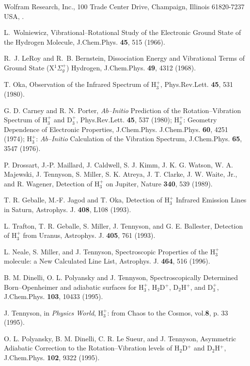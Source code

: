 \begin{thebibliography}{999}
Wolfram Research, Inc., 
100 Trade Center Drive, Champaign, Illinois 61820-7237
USA,
.

L.~Wolniewicz,
Vibrational--Rotational Study of the Electronic Ground State 
of the Hydrogen Molecule,
\newblock J.Chem.Phys. {\bf 45}, 515 (1966).

R.~J. Le{R}oy and R.~B. Bernstein,
Dissociation Energy and Vibrational Terms of Ground State 
(X$^{1} \Sigma _g ^+$) Hydrogen,
\newblock  J.Chem.Phys. {\bf 49}, 4312 (1968).


T. Oka, 
Observation of the Infrared Spectrum of H$_3^+$, 
Phys.Rev.Lett. {\bf 45}, 531 (1980).

G. D. Carney and R. N. Porter, 
{\it Ab--Initio} Prediction of the Rotation--Vibration 
Spectrum of H$_3^+$ and D$_3^+$,
Phys.Rev.Lett. {\bf 45}, 537 (1980);
H$_3^+$: Geometry Dependence of Electronic Properties, J.Chem.Phys. 
J.Chem.Phys. {\bf 60}, 4251 (1974);
H$_3^+$: {\it Ab--Initio} Calculation of the Vibration Spectrum,
J.Chem.Phys. {\bf 65}, 3547 (1976).

P. Drossart, J.-P. Maillard, J. Caldwell, S. J. Kimm,
J. K. G. Watson, W. A. Majewski, J. Tennyson, S. Miller, S. K. Atreya,
J. T. Clarke, J. W. Waite, Jr., and R. Wagener, 
Detection of H$_3^+$ on Jupiter,
Nature {\bf 340},
539 (1989).

T. R. Geballe, M.-F. Jagod and T. Oka, 
Detection of H$_3^+$ Infrared Emission Lines
in Saturn,
Astrophys. J. {\bf 408},
L108 (1993).

L. Trafton, T. R. Geballe, S. Miller, J. Tennyson, and
G. E. Ballester, 
Detection of H$_3^+$ from Uranus,
Astrophys. J. {\bf 405}, 761 (1993).

L. Neale, S. Miller, and J. Tennyson, 
Spectroscopic Properties of the H$_3^+$ molecule:
a New Calculated Line List,
Astrophys. J. {\bf 464}, 516
(1996).

B. M. Dinelli, O. L. Polyansky and J. Tennyson, 
Spectroscopically Determined Born--Openheimer and
adiabatic surfaces for 
H$_3^+$, H$_2$D$^+$, D$_2$H$^+$, and D$_3^+$,
J.Chem.Phys. {\bf 103},
10433 (1995).

J. Tennyson, in {\em Physics World}, 
H$_3^+$: from Chaos to the Cosmos,
vol.{\bf 8}, p. 33 (1995).

O. L. Polyansky, B. M. Dinelli, C. R. Le Sueur, and J. Tennyson,
Asymmetric Adiabatic Correction to the Rotation--Vibration levels
of H$_2$D$^+$ and D$_2$H$^+$,
J.Chem.Phys. {\bf 102}, 9322 (1995).


\end{thebibliography}
